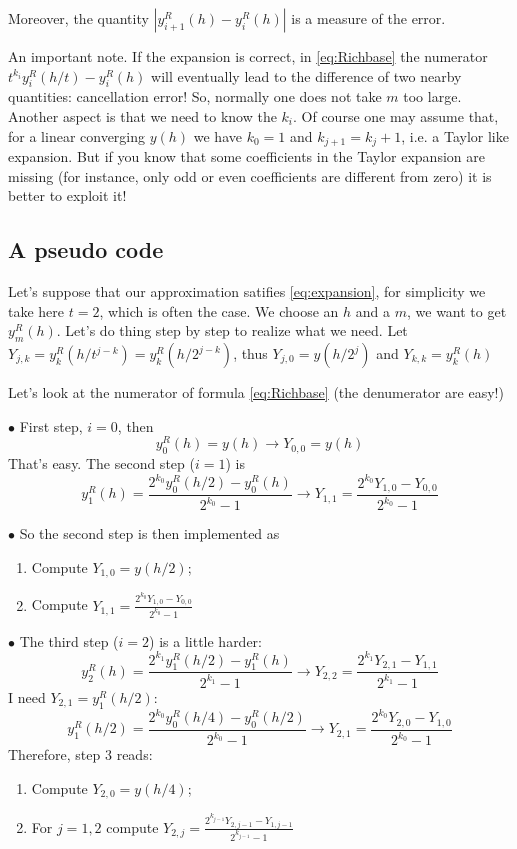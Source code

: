 \documentclass[10pt,a4paper,twoside]{article}
\begin{document}
  Moreover, the quantity $|y^R_{i+1}(h)- y^R_i(h)|$ is a measure of the error.
    
    An important note. If the expansion is correct, in \eqref{eq:Richbase} the numerator $t^{k_i}y^R_i(h/t)-y^R_i(h)$ will eventually lead to the difference of two nearby quantities: cancellation error! So, normally one does not take $m$ too large. Another aspect is that we need to know the $k_i$. Of course one may assume that, for a linear converging $y(h)$ we have $k_0=1$ and 
    $k_{j+1}=k_j+1$, i.e. a Taylor like expansion. But if you know that some coefficients in the Taylor expansion are missing (for instance, only odd or even coefficients are different from zero) it is better to exploit it!
  
  \subsection{A pseudo code}
  Let's suppose that our approximation satifies \eqref{eq:expansion}, for simplicity we take here $t=2$, which is often the case. We choose an $h$ and a $m$, we want to get $y^R_m(h)$.
  Let's do thing step by step to realize what we need. Let $Y_{j,k}=y^R_k(h/t^{j-k})=y^R_k(h/2^{j-k})$, thus $Y_{j,0}=y(h/2^j)$ and $Y_{k,k}=y^R_k(h)$
 
  Let's look at the numerator of formula \eqref{eq:Richbase} (the denumerator are easy!)
  
\noindent$\bullet$ First step, $i=0$, then
  \[
  y^R_0(h)=y(h) \rightarrow Y_{0,0}=y(h)
  \]
  That's easy. 
  The second step ($i=1$) is
  \[
  y^R_1(h)=\frac{2^{k_0}y^R_0(h/2)-y^R_0(h)}{2^{k_0}-1} \rightarrow Y_{1,1}=\frac{2^{k_0}Y_{1,0}-Y_{0,0}}{2^{k_0}-1}
  \]
  
\noindent$\bullet$ So the second step is then implemented as
  \begin{enumerate}
      \item Compute $Y_{1,0}=y(h/2)$;
      \item Compute $Y_{1,1}=\frac{2^{k_0}Y_{1,0}-Y_{0,0}}{2^{k_0}-1}$
  \end{enumerate}
  
$\bullet$ The third  step ($i=2$) is a little harder:
 \[
 y^R_2(h)=\frac{2^{k_1}y^R_1(h/2)-y^R_1(h)}{2^{k_1}-1} \rightarrow Y_{2,2}=\frac{2^{k_1}Y_{2,1}-Y_{1,1}}{2^{k_1}-1}
 \]
I need $Y_{2,1}=y^R_1(h/2)$:
\[
y^R_1(h/2)=\frac{2^{k_0}y^R_0(h/4)-y^R_0(h/2)}{2^{k_0}-1}\rightarrow Y_{2,1}=\frac{2^{k_0}Y_{2,0}-Y_{1,0}}{2^{k_0}-1}
\]
Therefore, step 3 reads:
\begin{enumerate}
    \item Compute $Y_{2,0}=y(h/4)$;
    \item For $j=1,2$ compute $Y_{2,j}=\frac{2^{k_{j-1}}Y_{2,j-1}-Y_{1,j-1}}{2^{k_{j-1}}-1}$
\end{enumerate}
 
\end{document}
